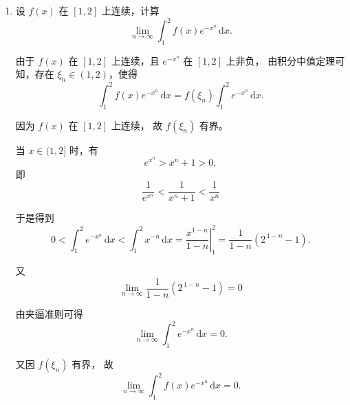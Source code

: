 \documentclass[a4paper,12pt]{article}
\begin{document}
    \begin{enumerate}
        \item 设 $f(x)$ 在 $[1,2]$ 上连续，计算
        \[
            \lim_{n\to\infty}\int_{1}^{2} f(x)e^{-x^{n}}\,\mathrm{d}x.
        \]

        \begin{analysisbox}[Example]

            由于 $f(x)$ 在 $[1,2]$ 上连续，且 $e^{-x^n}$ 在 $[1,2]$ 上非负，
            由积分中值定理可知，存在 $\xi_n \in (1,2)$，使得
            \[
                \int_{1}^{2} f(x)e^{-x^n}\,\mathrm{d}x
                =
                f(\xi_n)\int_{1}^{2} e^{-x^n}\,\mathrm{d}x.
            \]

            因为 $f(x)$ 在 $[1,2]$ 上连续，
            故 $f(\xi_n)$ 有界。

            当 $x\in(1,2]$ 时，有
            \[
                e^{x^n} > x^n + 1 > 0,
            \]
            即
            \[
                \frac{1}{e^{x^n}} < \frac{1}{x^n + 1} < \frac{1}{x^n}
            \]

            于是得到
            \[
                0
                <
                \int_{1}^{2} e^{-x^n}\,\mathrm{d}x
                <
                \int_{1}^{2} x^{-n}\,\mathrm{d}x =
                \left.
                \frac{x^{1-n}}{1-n}
                \right|_{1}^{2}
                =
                \frac{1}{1-n}\left(2^{\,1-n}-1\right).
            \]

            又
            \[
                \lim_{n\to\infty} \frac{1}{1-n}\left(2^{\,1-n}-1\right) = 0
            \]

            由夹逼准则可得
            \[
                \lim_{n\to\infty}\int_{1}^{2} e^{-x^n}\,\mathrm{d}x = 0.
            \]

            又因 $f(\xi_n)$ 有界，
            故
            \[
                \lim_{n\to\infty}
                \int_{1}^{2} f(x)e^{-x^n}\,\mathrm{d}x
                =
                0.
            \]

        \end{analysisbox}
    \end{enumerate}
\end{document}
